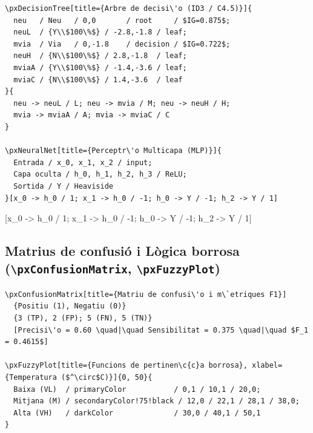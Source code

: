 \documentclass[11pt,a4paper]{article}
\begin{document}
\begin{verbatim}
\pxDecisionTree[title={Arbre de decisi\'o (ID3 / C4.5)}]{
  neu   / Neu   / 0,0       / root     / $IG=0.875$;
  neuL  / {Y\\$100\%$} / -2.8,-1.8 / leaf;
  mvia  / Via   / 0,-1.8    / decision / $IG=0.722$;
  neuH  / {N\\$100\%$} / 2.8,-1.8  / leaf;
  mviaA / {Y\\$100\%$} / -1.4,-3.6 / leaf;
  mviaC / {N\\$100\%$} / 1.4,-3.6  / leaf
}{
  neu -> neuL / L; neu -> mvia / M; neu -> neuH / H;
  mvia -> mviaA / A; mvia -> mviaC / C
}

\pxNeuralNet[title={Perceptr\'o Multicapa (MLP)}]{
  Entrada / x_0, x_1, x_2 / input;
  Capa oculta / h_0, h_1, h_2, h_3 / ReLU;
  Sortida / Y / Heaviside
}[x_0 -> h_0 / 1; x_1 -> h_0 / -1; h_0 -> Y / -1; h_2 -> Y / 1]
\end{verbatim}


[x_0 -> h_0 / 1; x_1 -> h_0 / -1; h_0 -> Y / -1; h_2 -> Y / 1]

\subsection{Matrius de confusi\'o i L\`ogica borrosa (\texttt{\textbackslash pxConfusionMatrix}, \texttt{\textbackslash pxFuzzyPlot})}

\begin{verbatim}
\pxConfusionMatrix[title={Matriu de confusi\'o i m\`etriques F1}]
  {Positiu (1), Negatiu (0)}
  {3 (TP), 2 (FP); 5 (FN), 5 (TN)}
  [Precisi\'o = 0.60 \quad|\quad Sensibilitat = 0.375 \quad|\quad $F_1 = 0.4615$]

\pxFuzzyPlot[title={Funcions de pertinen\c{c}a borrosa}, xlabel={Temperatura ($^\circ$C)}]{0, 50}{
  Baixa (VL)  / primaryColor           / 0,1 / 10,1 / 20,0;
  Mitjana (M) / secondaryColor!75!black / 12,0 / 22,1 / 28,1 / 38,0;
  Alta (VH)   / darkColor              / 30,0 / 40,1 / 50,1
}
\end{verbatim}
\end{document}
